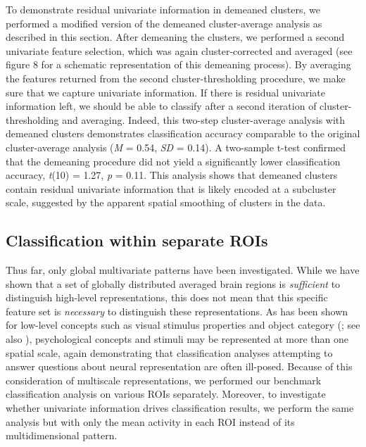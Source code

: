 \documentclass[jou,12pt,a4paper]{apa6}
\begin{document}
To demonstrate residual univariate information in demeaned clusters, we performed a modified version of the demeaned cluster-average analysis as described in this section. After demeaning the clusters, we performed a second univariate feature selection, which was again cluster-corrected and averaged (see figure 8 for a schematic representation of this demeaning process). By averaging the features returned from the second cluster-thresholding procedure, we make sure that we capture univariate information. If there is residual univariate information left, we should be able to classify after a second iteration of cluster-thresholding and averaging. Indeed, this two-step cluster-average analysis with demeaned clusters demonstrates classification accuracy comparable to the original cluster-average analysis (\emph{M} = 0.54, \emph{SD} = 0.14). A two-sample t-test confirmed that the demeaning procedure did not yield a significantly lower classification accuracy, \emph{t}(10) = 1.27, \emph{p} = 0.11. This analysis shows that demeaned clusters contain residual univariate information that is likely encoded at a subcluster scale, suggested by the apparent spatial smoothing of clusters in the data. 

\subsection{Classification within separate ROIs}
Thus far, only global multivariate patterns have been investigated. While we have shown that a set of globally distributed averaged brain regions is \emph{sufficient} to distinguish high-level representations, this does not mean that this specific feature set is \emph{necessary} to distinguish these representations. As has been shown for low-level concepts such as visual stimulus properties \cite{swisher2010,drucker2009,freeman2011} and object category (; see also ), psychological concepts and stimuli may be represented at more than one spatial scale, again demonstrating that classification analyses attempting to answer questions about neural representation are often ill-posed. Because of this consideration of multiscale representations, we performed our benchmark classification analysis on various ROIs separately. Moreover, to investigate whether univariate information drives classification results, we perform the same analysis but with only the mean activity in each ROI instead of its multidimensional pattern. 
\end{document}
